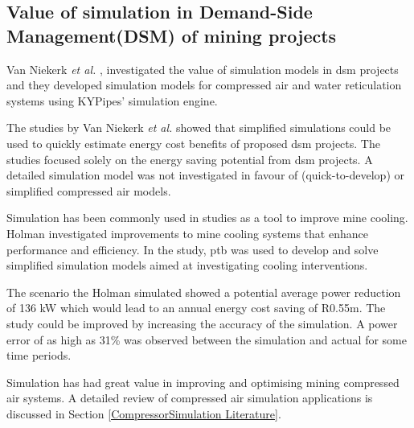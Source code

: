 	\subsection{Value of simulation in Demand-Side Management(DSM) of mining projects}
	Van Niekerk \textit{et al.} \cite{van2013value}, \cite{vanNiekerk2012Value} investigated the value of simulation models in \gls{dsm} projects and they developed simulation models for compressed air and water reticulation systems using KYPipes' simulation engine. 
	\par 
	The studies by Van Niekerk \textit{et al.} showed that simplified simulations could be used to quickly estimate energy cost benefits of proposed \gls{dsm} projects. The studies focused solely on the energy saving potential from \gls{dsm} projects. A detailed simulation model was not investigated in favour of (quick-to-develop) or simplified compressed air models.
	\par
	Simulation has been commonly used in studies as a tool to improve mine cooling. Holman \cite{Holman2014Masters} investigated improvements to mine cooling systems that enhance performance and efficiency. In the study, \gls{ptb} was used to develop and solve simplified simulation models aimed at investigating cooling interventions.
	\par 
	The scenario the Holman simulated showed a potential average power reduction of 136 kW which would lead to an annual energy cost saving of R0.55m. The study could be improved by increasing the accuracy of the simulation. A power error of as high as 31\% was observed between the simulation and actual for some time periods.
	\par
	Simulation has had great value in improving and optimising mining compressed air systems. A detailed review of compressed air simulation applications is discussed in Section \ref{CompressorSimulation Literature}.
